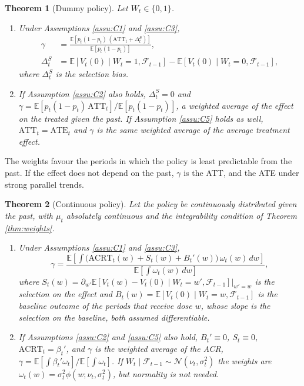 \documentclass[12pt,a4paper]{article}
\newtheorem{thm}{Theorem}
\theoremstyle{definition}
\newcommand{\E}{\mathbb{E}}
\begin{document}
\begin{thm}[Dummy policy\label{thm:dummy}]
Let $W_t\in\{0,1\}$.
\begin{enumerate}
\item[(a)] Under Assumptions \ref{assu:C1} and \ref{assu:C3},
\begin{equation}
\begin{aligned}
\gamma&=\frac{\E[p_t(1-p_t)\,(\mathrm{ATT}_t+\Delta_t^S)]}{\E[p_t(1-p_t)]},\\
\Delta_t^S&=\E[V_t(0)\mid W_t=1,\mathcal{F}_{t-1}]-\E[V_t(0)\mid W_t=0,\mathcal{F}_{t-1}],
\end{aligned}
\label{eq:dummy-a}
\end{equation}
where $\Delta_t^S$ is the selection bias.
\item[(b)] If Assumption \ref{assu:C2} also holds, $\Delta_t^S=0$ and $\gamma=\E[p_t(1-p_t)\,\mathrm{ATT}_t]/\E[p_t(1-p_t)]$, a weighted average of the effect on the treated given the past. If Assumption \ref{assu:C5} holds as well, $\mathrm{ATT}_t=\mathrm{ATE}_t$ and $\gamma$ is the same weighted average of the average treatment effect.
\end{enumerate}
\end{thm}

The weights favour the periods in which the policy is least predictable from the past. If the effect does not depend on the past, $\gamma$ is the ATT, and the ATE under strong parallel trends.

\begin{thm}[Continuous policy\label{thm:continuous}]
Let the policy be continuously distributed given the past, with $\mu_t$ absolutely continuous and the integrability condition of Theorem \ref{thm:weights}.
\begin{enumerate}
\item[(a)] Under Assumptions \ref{assu:C1} and \ref{assu:C3},
\begin{equation}
\gamma=\frac{\E\left[\int\big(\mathrm{ACRT}_t(w)+S_t(w)+B_t'(w)\big)\,\omega_t(w)\,dw\right]}{\E\left[\int\omega_t(w)\,dw\right]},
\label{eq:cont-a}
\end{equation}
where $S_t(w)=\partial_{w'}\E[V_t(w)-V_t(0)\mid W_t=w',\mathcal{F}_{t-1}]|_{w'=w}$ is the selection on the effect and $B_t(w)=\E[V_t(0)\mid W_t=w,\mathcal{F}_{t-1}]$ is the baseline outcome of the periods that receive dose $w$, whose slope is the selection on the baseline, both assumed differentiable.
\item[(b)] If Assumptions \ref{assu:C2} and \ref{assu:C5} also hold, $B_t'\equiv0$, $S_t\equiv0$, $\mathrm{ACRT}_t=\beta_t'$, and $\gamma$ is the weighted average of the ACR, $\gamma=\E[\int\beta_t'\omega_t]/\E[\int\omega_t]$. If $W_t\mid\mathcal{F}_{t-1}\sim\mathcal{N}(\nu_t,\sigma_t^2)$ the weights are $\omega_t(w)=\sigma_t^2\phi(w;\nu_t,\sigma_t^2)$, but normality is not needed.
\end{enumerate}
\end{thm}
\end{document}
